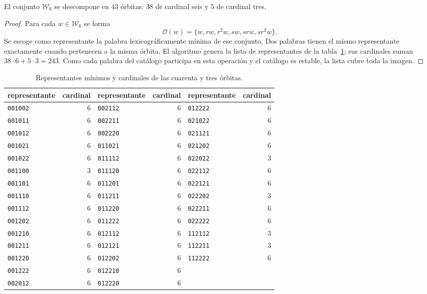 \begin{proposition}
\label{act21:tpk:43}
El conjunto \(\mathcal W_6\) se descompone en \(43\) órbitas: \(38\)
de cardinal seis y \(5\) de cardinal tres.
\end{proposition}
\begin{proof}
Para cada \(w\in\mathcal W_6\) se forma
\[
 \mathcal O(w)=\{w,rw,r^2w,sw,srw,sr^2w\}.
\]
Se escoge como representante la palabra lexicográficamente mínima de ese
conjunto. Dos palabras tienen el mismo representante exactamente cuando
pertenecen a la misma órbita. El algoritmo genera la lista de representantes
de la tabla~\ref{act21:tpk:representantes}; sus cardinales suman
\(38\cdot6+5\cdot3=243\). Como cada palabra del catálogo participa en
esta operación y el catálogo es estable, la lista cubre toda la imagen.
\end{proof}

\begin{table}[htbp]
\caption{Representantes mínimos y cardinales de las cuarenta y tres órbitas.}
\label{act21:tpk:representantes}
\small
\begin{tabular}{@{}lr@{\qquad}lr@{\qquad}lr@{}}
\toprule
representante&cardinal&representante&cardinal&representante&cardinal\\
\midrule
\texttt{001002}&6&\texttt{002112}&6&\texttt{012222}&6\\
\texttt{001011}&6&\texttt{002211}&6&\texttt{021022}&6\\
\texttt{001012}&6&\texttt{002220}&6&\texttt{021121}&6\\
\texttt{001021}&6&\texttt{011021}&6&\texttt{021202}&6\\
\texttt{001022}&6&\texttt{011112}&6&\texttt{022022}&3\\
\texttt{001100}&3&\texttt{011120}&6&\texttt{022112}&6\\
\texttt{001101}&6&\texttt{011201}&6&\texttt{022121}&6\\
\texttt{001110}&6&\texttt{011211}&6&\texttt{022202}&3\\
\texttt{001112}&6&\texttt{011220}&6&\texttt{022211}&6\\
\texttt{001202}&6&\texttt{011222}&6&\texttt{022222}&6\\
\texttt{001210}&6&\texttt{012112}&6&\texttt{112112}&3\\
\texttt{001211}&6&\texttt{012121}&6&\texttt{112211}&3\\
\texttt{001220}&6&\texttt{012202}&6&\texttt{112222}&6\\
\texttt{001222}&6&\texttt{012210}&6&&\\
\texttt{002012}&6&\texttt{012220}&6&&\\
\bottomrule
\end{tabular}
\end{table}

